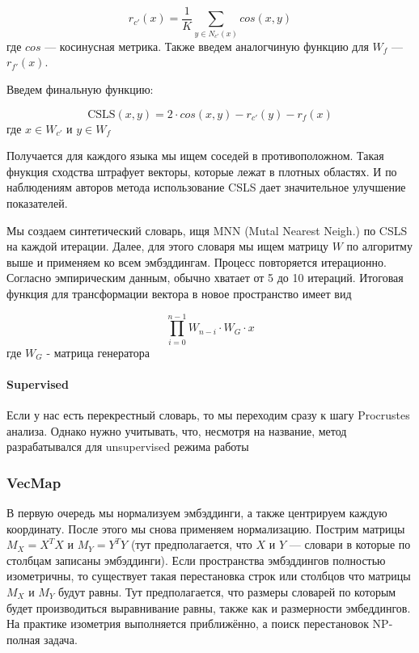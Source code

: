 \documentclass{article}
\begin{document}
    \begin{equation}
        r_{c'}(x) = \frac{1}{K} \sum_{y \in N_{c'}(x)} cos(x, y)
    \end{equation}
    где $cos$ --- косинусная метрика. Также введем аналогчиную функцию для $W_{f}$ --- $r_{f'}(x)$.

    Введем финальную функцию: 

    \begin{equation}
        \text{CSLS}(x, y) = 2 \cdot cos(x, y) - r_{c'}(y) - r_{f}(x)
    \end{equation}
    где $x \in W_{c'}$ и $y \in W_{f}$

    Получается для каждого языка мы ищем соседей в противоположном. Такая фнукция сходства штрафует векторы, которые 
    лежат в плотных областях. И по наблюдениям авторов метода использование CSLS дает значительное улучшение показателей.
    
    \quad 

    Мы создаем синтетический словарь, ищя MNN (Mutal Nearest Neigh.) по CSLS на каждой итерации.
    Далее, для этого словаря мы ищем матрицу $W$ по алгоритму выше и применяем ко всем эмбэддингам. 
    Процесс повторяется итерационно. Согласно эмпирическим данным, обычно хватает от 5 до 10 итераций.
    Итоговая функция для трансформации вектора в новое пространство имеет вид 

    \begin{equation}
        \prod_{i = 0}^{n - 1} W_{n - i} \cdot W_{G} \cdot x
    \end{equation}
    где $W_{G}$ - матрица генератора

    \paragraph{Supervised}

    \quad

    Если у нас есть перекрестный словарь, то мы переходим сразу к шагу Procrustes анализа. Однако нужно учитывать, что, несмотря 
    на название, метод разрабатывался для unsupervised режима работы

    \subsubsection{VecMap}

    В первую очередь мы нормализуем эмбэддинги, а также центрируем каждую координату. После этого мы снова применяем 
    нормализацию. Пострим матрицы $M_{X} = X^{T} X$ и $M_{Y} = Y^{T}Y$ (тут предполагается, что $X$ и $Y$ --- словари в которые по столбцам записаны эмбэддинги).
    Если пространства эмбэддингов полностью изометричны, то существует такая перестановка строк или столбцов что матрицы $M_{X}$ и $M_{Y}$ будут равны.
    Тут предполагается, что размеры словарей по которым будет производиться выравнивание равны, также как и размерности эмбеддингов. 
    На практике изометрия выполняется приближённо, а поиск перестановок NP-полная задача. 
\end{document}
